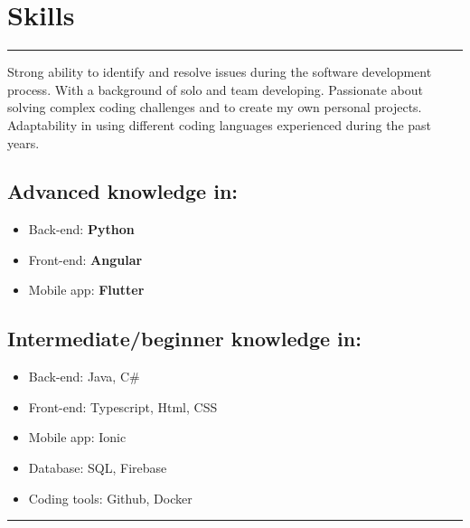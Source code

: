 \documentclass[a4paper,10pt]{article}
\begin{document}
\begin{minipage}[t]{0.25\textwidth}
    \section*{Skills}
    \vspace{5.9cm}
    \rule{0.6cm}{0.3mm}
\end{minipage}
\hfill
\begin{minipage}[t]{0.75\textwidth}
    
    Strong ability to identify and resolve issues during the software development process. With a background of solo and team developing. Passionate about solving complex coding challenges and to create my own personal projects. Adaptability in using different coding languages experienced during the past years.
    \subsection*{Advanced knowledge in:}
    \begin{itemize}[leftmargin=1cm]
        \item Back-end: \textbf{Python} 
        \item Front-end: \textbf{Angular}
        \item Mobile app: \textbf{Flutter}
    \end{itemize}
    \subsection*{Intermediate/beginner knowledge in:}
    \begin{itemize}[leftmargin=1cm]
        \item Back-end: Java, C\# 
        \item Front-end: Typescript, Html, CSS
        \item Mobile app: Ionic
        \item Database: SQL, Firebase
        \item Coding tools: Github, Docker
    \end{itemize}

    \rule{\linewidth}{0.5mm}
\end{minipage}
\end{document}
